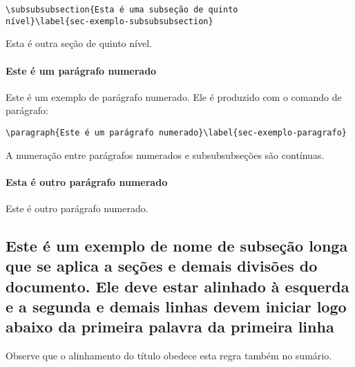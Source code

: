 \begin{verbatim}
\subsubsubsection{Esta é uma subseção de quinto
nível}\label{sec-exemplo-subsubsubsection}
\end{verbatim}

\label{sec-exemplo-subsubsubsection-outro}

Esta é outra seção de quinto nível.


\paragraph{Este é um parágrafo numerado}\label{sec-exemplo-paragrafo}

Este é um exemplo de parágrafo numerado. Ele é produzido com o comando de
parágrafo:

\begin{verbatim}
\paragraph{Este é um parágrafo numerado}\label{sec-exemplo-paragrafo}
\end{verbatim}

A numeração entre parágrafos numerados e subsubsubseções são contínuas.

\paragraph{Esta é outro parágrafo numerado}\label{sec-exemplo-paragrafo-outro}

Este é outro parágrafo numerado.

\subsection{Este é um exemplo de nome de subseção longa que se aplica a seções e demais divisões do documento. Ele deve estar alinhado à esquerda e a segunda e demais linhas devem iniciar logo abaixo da primeira palavra da primeira linha} 

Observe que o alinhamento do título obedece esta regra também no sumário.
	






